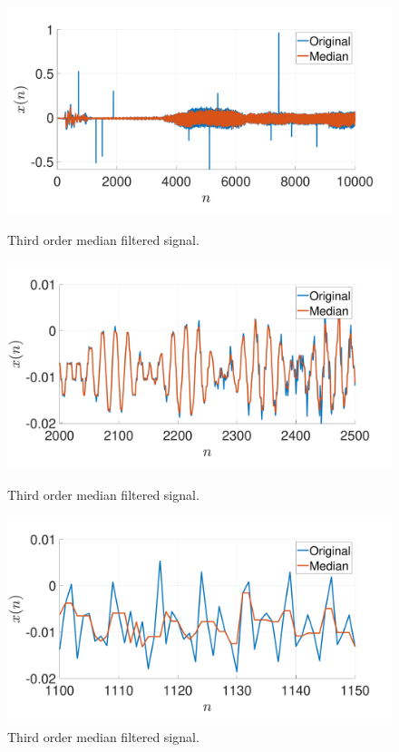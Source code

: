 \documentclass[a4paper, oneside, 11pt]{article}
\begin{document}
\begin{figure}[htbp]
	\begin{minipage}[b]{.49\textwidth}
		\centering
		\includegraphics[width= 1.1\textwidth]{figures/comp_median_zoom_out.pdf}
		\caption{Third order median filtered signal.}
		\label{fig:comp_median_zoom_out}
	\end{minipage}
	\hfill
	\begin{minipage}[b]{.49\textwidth}
		\centering
		\includegraphics[width= 1.1\textwidth]{figures/comp_median_zoom_med.pdf}
		\caption{Third order median filtered signal.}
		\label{fig:comp_median_zoom_med}
	\end{minipage}
	\begin{minipage}[b]{.49\textwidth}
		\centering
		\includegraphics[width= 1.1\textwidth]{figures/comp_median_zoom_in.pdf}
		\caption{Third order median filtered signal.}
		\label{fig:comp_median_zoom_in}
	\end{minipage}
\end{figure}
\end{document}
